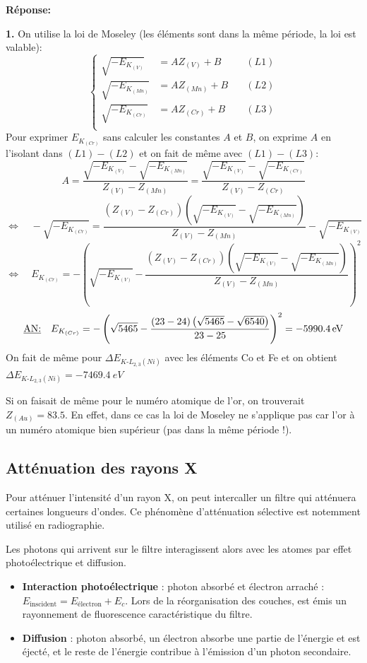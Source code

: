 \documentclass{article}
\begin{document}
\vspace{5cm}

\noindent\textbf{Réponse:}  \vspace{3mm}

\textbf{1.} \quad On utilise la loi de Moseley (les éléments sont dans la même période, la loi est valable): 
$$\left\{ \begin{aligned}
    \sqrt{-E_{K_{(V)}}} &= AZ_{(V)} + B \quad &(L1) \\
    \sqrt{-E_{K_{(Mn)}}} &= AZ_{(Mn)} + B \quad &(L2) \\
    \sqrt{-E_{K_{(Cr)}}} &= AZ_{(Cr)} + B \quad &(L3) \\
\end{aligned} \right. $$
Pour exprimer $E_{K_{(Cr)}}$ sans calculer les constantes $A$ et $B$, on exprime $A$ en l'isolant dans $(L1)-(L2)$ et on fait de même avec $(L1)-(L3)$:
$$ A = \frac{\sqrt{-E_{K_{(V)}}} - \sqrt{-E_{K_{(Mn)}}}}{Z_{(V)} - Z_{(Mn)}} = \frac{\sqrt{-E_{K_{(V)}}} - \sqrt{-E_{K_{(Cr)}}}}{Z_{(V)} - Z_{(Cr)}} $$
$$ \Longleftrightarrow \quad -\sqrt{-E_{K_{(Cr)}}} = \frac{(Z_{(V)} - Z_{(Cr)}) \left( \sqrt{-E_{K_{(V)}}} - \sqrt{-E_{K_{(Mn)}}}\right)}{Z_{(V)} - Z_{(Mn)}} - \sqrt{-E_{K_{(V)}}}$$
$$ \Longleftrightarrow \quad E_{K_{(Cr)}} = -\left(\sqrt{-E_{K_{(V)}}} - \frac{(Z_{(V)} - Z_{(Cr)}) \left( \sqrt{-E_{K_{(V)}}} - \sqrt{-E_{K_{(Mn)}}}\right)}{Z_{(V)} - Z_{(Mn)}}\right)^2$$
$$ \text{\underline{AN:}} \quad E_{K_{(Cr)}} = -\left(\sqrt{5465} - \frac{(23-24) \left( \sqrt{5465} - \sqrt{6540}\right)}{23-25}\right)^2 = \qty{-5990.4}{eV}$$
On fait de même pour $\Delta E_{K\text{-}L_{2,3}(Ni)}$ avec les éléments Co et Fe et on obtient $\Delta E_{K\text{-}L_{2,3}(Ni)} = \qty{-7469.4}{eV}$

Si on faisait de même pour le numéro atomique de l'or, on trouverait $Z_{(Au)} = 83.5$. En effet, dans ce cas la loi de Moseley ne s'applique pas car l'or à un numéro atomique bien supérieur (pas dans la même période !).



\subsection{Atténuation des rayons X}

Pour atténuer l'intensité d'un rayon X, on peut intercaller un filtre qui atténuera certaines longueurs d'ondes. 
Ce phénomène d'atténuation sélective est notemment utilisé en radiographie.

Les photons qui arrivent sur le filtre interagissent alors avec les atomes par effet photoélectrique et diffusion.
\begin{itemize}[label=$\ast$]
    \item \textbf{Interaction photoélectrique} : photon absorbé et électron arraché : $E_{\text{inscident}} = E_{\text{électron}} + E_c$.
    Lors de la réorganisation des couches, est émis un rayonnement de fluorescence caractéristique du filtre.
    \item \textbf{Diffusion} : photon absorbé, un électron absorbe une partie de l'énergie et est éjecté, et le reste de l'énergie contribue à l'émission d'un photon secondaire.
\end{itemize}
\end{document}

